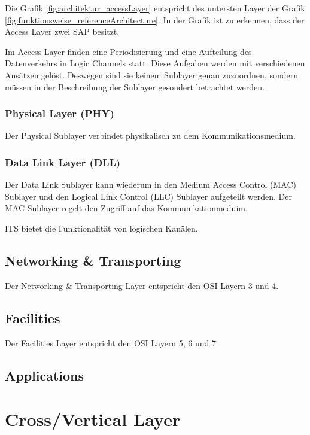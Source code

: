 Die Grafik \ref{fig:architektur_accessLayer} entspricht des untersten Layer der Grafik \ref{fig:funktionsweise_referenceArchitecture}. In der Grafik ist zu erkennen, dass der Access Layer zwei \ac{SAP} besitzt.


Im Access Layer finden eine Periodisierung und eine Aufteilung des Datenverkehrs in Logic Channels statt. Diese Aufgaben werden mit verschiedenen Ansätzen gelöst. Deswegen sind sie keinem Sublayer genau zuzuordnen, sondern müssen in der Beschreibung der Sublayer gesondert betrachtet werden.


\subsubsection{Physical Layer (PHY)}
Der Physical Sublayer verbindet physikalisch zu dem Kommunikationsmedium.

\subsubsection{Data Link Layer (DLL)}
Der Data Link Sublayer kann wiederum in den Medium Access Control (MAC) Sublayer und den Logical Link Control (LLC) Sublayer aufgeteilt werden. Der MAC Sublayer regelt den Zugriff auf das Kommunikationmeduim.


\ac{ITS} bietet die Funktionalität von logischen Kanälen. 




\subsection{Networking \& Transporting \label{architektur_networkingTransporting}}
Der Networking \& Transporting Layer entspricht den \ac{OSI} Layern 3 und 4.


\subsection{Facilities}
Der Facilities Layer entspricht den \ac{OSI} Layern 5, 6 und 7

\subsection{Applications}


\section{Cross/Vertical Layer}
